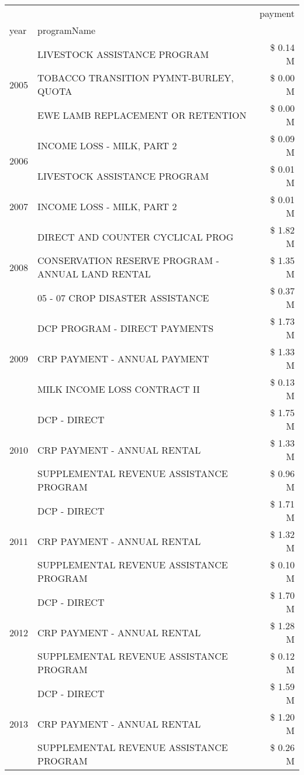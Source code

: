 \begin{tabular}{llr}
\toprule
 &  & payment \\
year & programName &  \\
\midrule
\multirow[t]{3}{*}{2005} & LIVESTOCK ASSISTANCE PROGRAM & \$ 0.14 M \\
 & TOBACCO TRANSITION PYMNT-BURLEY, QUOTA & \$ 0.00 M \\
 & EWE LAMB REPLACEMENT OR RETENTION & \$ 0.00 M \\
\cline{1-3}
\multirow[t]{2}{*}{2006} & INCOME LOSS - MILK, PART 2 & \$ 0.09 M \\
 & LIVESTOCK ASSISTANCE PROGRAM & \$ 0.01 M \\
\cline{1-3}
2007 & INCOME LOSS - MILK, PART 2 & \$ 0.01 M \\
\cline{1-3}
\multirow[t]{3}{*}{2008} & DIRECT AND COUNTER CYCLICAL PROG & \$ 1.82 M \\
 & CONSERVATION RESERVE PROGRAM - ANNUAL LAND RENTAL & \$ 1.35 M \\
 & 05 - 07 CROP DISASTER ASSISTANCE & \$ 0.37 M \\
\cline{1-3}
\multirow[t]{3}{*}{2009} & DCP PROGRAM - DIRECT PAYMENTS & \$ 1.73 M \\
 & CRP PAYMENT - ANNUAL PAYMENT & \$ 1.33 M \\
 & MILK INCOME LOSS CONTRACT II & \$ 0.13 M \\
\cline{1-3}
\multirow[t]{3}{*}{2010} & DCP - DIRECT & \$ 1.75 M \\
 & CRP PAYMENT - ANNUAL RENTAL & \$ 1.33 M \\
 & SUPPLEMENTAL REVENUE ASSISTANCE PROGRAM & \$ 0.96 M \\
\cline{1-3}
\multirow[t]{3}{*}{2011} & DCP - DIRECT & \$ 1.71 M \\
 & CRP PAYMENT - ANNUAL RENTAL & \$ 1.32 M \\
 & SUPPLEMENTAL REVENUE ASSISTANCE PROGRAM & \$ 0.10 M \\
\cline{1-3}
\multirow[t]{3}{*}{2012} & DCP - DIRECT & \$ 1.70 M \\
 & CRP PAYMENT - ANNUAL RENTAL & \$ 1.28 M \\
 & SUPPLEMENTAL REVENUE ASSISTANCE PROGRAM & \$ 0.12 M \\
\cline{1-3}
\multirow[t]{3}{*}{2013} & DCP - DIRECT & \$ 1.59 M \\
 & CRP PAYMENT - ANNUAL RENTAL & \$ 1.20 M \\
 & SUPPLEMENTAL REVENUE ASSISTANCE PROGRAM & \$ 0.26 M \\
\cline{1-3}

\end{tabular}
